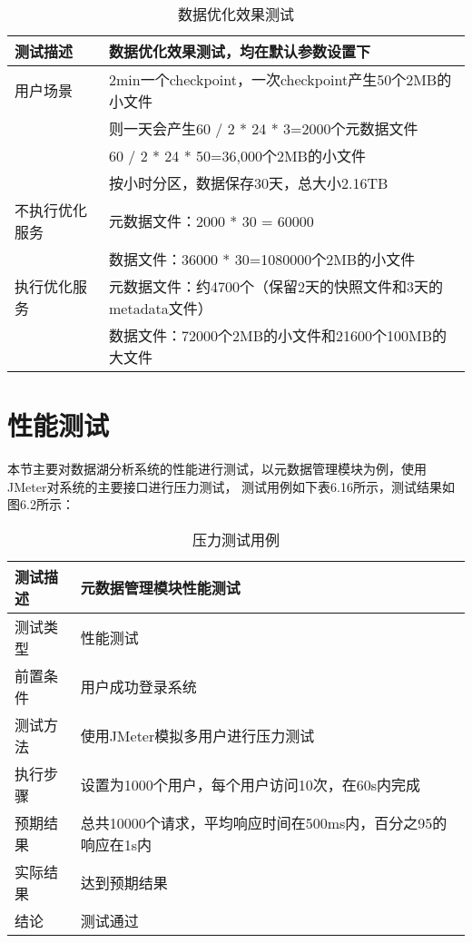 \begin{table}[h]
  \centering
  \caption{数据优化效果测试}
  \label{tab:exampletable}
  \begin{tabular}{ll}
    \toprule
    测试描述         & 数据优化效果测试，均在默认参数设置下         \\
    \midrule
    用户场景         & 2min一个checkpoint，一次checkpoint产生50个2MB的小文件   \\
                   & 则一天会产生60 / 2 * 24 * 3=2000个元数据文件          \\
                   & 60 / 2 * 24 * 50=36,000个2MB的小文件              \\
                   & 按小时分区，数据保存30天，总大小2.16TB         \\
    不执行优化服务         & 元数据文件：2000 * 30 = 60000         \\
                        & 数据文件：36000 * 30=1080000个2MB的小文件         \\
    执行优化服务       & 元数据文件：约4700个（保留2天的快照文件和3天的metadata文件）        \\
                    & 数据文件：72000个2MB的小文件和21600个100MB的大文件        \\
    \bottomrule
  \end{tabular}
\end{table}

\section{性能测试}

本节主要对数据湖分析系统的性能进行测试，以元数据管理模块为例，使用JMeter对系统的主要接口进行压力测试，
测试用例如下表6.16所示，测试结果如图6.2所示：

\begin{table}[h]
  \centering
  \caption{压力测试用例}
  \label{tab:exampletable}
  \begin{tabular}{ll}
    \toprule
    测试描述         & 元数据管理模块性能测试         \\
    \midrule
    测试类型         & 性能测试         \\
    前置条件         & 用户成功登录系统         \\
    测试方法         & 使用JMeter模拟多用户进行压力测试        \\
    执行步骤         & 设置为1000个用户，每个用户访问10次，在60s内完成      \\
    预期结果         & 总共10000个请求，平均响应时间在500ms内，百分之95的响应在1s内      \\
    实际结果         & 达到预期结果           \\
    结论            & 测试通过           \\
    \bottomrule
  \end{tabular}
\end{table}

